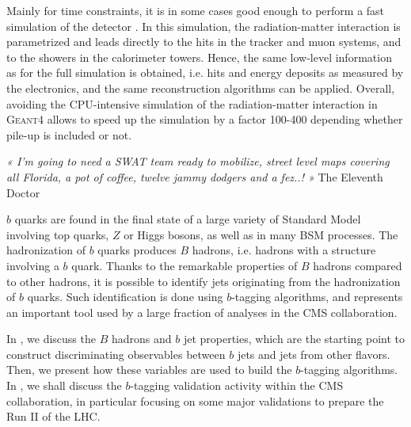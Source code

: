     Mainly for time constraints, it is in some cases good enough to perform a
    fast simulation of the detector \cite{Fastsim}. In this simulation, the radiation-matter
    interaction is parametrized and leads
    directly to the hits in the tracker and muon systems, and to the showers
    in the calorimeter towers. Hence, the same low-level information as for the
    full simulation is obtained, i.e. hits and energy deposits as measured by
    the electronics, and the same reconstruction algorithms can be applied.
    Overall, avoiding the CPU-intensive simulation of the radiation-matter interaction
    in \textsc{Geant4} allows to speed up the simulation by a factor 100-400
    depending whether pile-up is included or not.


\setcounter{mtc}{4}
\hspace*{0.39\textwidth}
\begin{minipage}{0.60\textwidth}
\emph{« I'm going to need a SWAT team ready to mobilize, street level maps covering all
Florida, a pot of coffee, twelve jammy dodgers and a fez..! »}
\hspace*{0.4\textwidth} The Eleventh Doctor
\end{minipage}
\minitoc
\newpage


    $b$ quarks are found in the final state of a large variety of Standard Model
    involving top quarks, $Z$ or Higgs bosons, as well as in many BSM processes.
    The hadronization of $b$ quarks produces $B$ hadrons, i.e. hadrons with a structure
    involving a $b$ quark. Thanks to the remarkable properties of $B$ hadrons compared to
    other hadrons,
    it is possible to identify jets originating from the hadronization of $b$ quarks.
    Such identification is done using $b$-tagging algorithms, and represents an important tool used
    by a large fraction of analyses in the CMS collaboration.

    In , we discuss the $B$ hadrons and $b$ jet properties,
    which are the starting point to construct discriminating observables between $b$ jets
    and jets from other flavors. Then, we present how these variables are used to build
    the $b$-tagging algorithms. In , we shall discuss
    the $b$-tagging validation activity within the CMS collaboration, in particular
    focusing on some major validations to prepare the Run II of the LHC.

